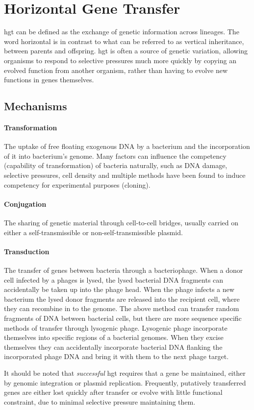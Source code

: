 \section*{Horizontal Gene Transfer}
\ac{hgt} can be defined as the exchange of genetic information across lineages\citep{lgt}.
The word horizontal is in contrast to what can be referred to as vertical inheritance, between parents and offspring\citep{ihgt}.
\ac{hgt} is often a source of genetic variation, allowing organisms to respond to selective pressures much more quickly by copying an evolved function from another organism, rather than having to evolve new functions in genes themselves\citep{ihgt,adaevo}.\par
\subsection*{Mechanisms}
\paragraph{Transformation}
The uptake of free floating exogenous DNA by a bacterium and the incorporation of it into bacterium's genome\citep{lgt}.
Many factors can influence the competency (capability of transformation) of bacteria naturally, such as DNA damage, selective pressures, cell density and multiple methods have been found to induce competency for experimental purposes (cloning)\citep{natcomp}.
\paragraph{Conjugation}
The sharing of genetic material through cell-to-cell bridges, usually carried on either a self-transmissible or non-self-transmissible plasmid\citep{conjug}.
\paragraph{Transduction}
The transfer of genes between bacteria through a bacteriophage\citep{transd}.
When a donor cell infected by a phages is lysed, the lysed bacterial DNA fragments can accidentally be taken up into the phage head\citep{transd}.
When the phage infects a new bacterium the lysed donor fragments are released into the recipient cell, where they can recombine in to the genome\citep{transd}.
The above method can transfer random fragments of DNA between bacterial cells, but there are more sequence specific methods of transfer through lysogenic phage\citep{transd}.
Lysogenic phage incorporate themselves into specific regions of a bacterial genomes\citep{transd}.
When they excise themselves they can accidentally incorporate bacterial DNA flanking the incorporated phage DNA and bring it with them to the next phage target\citep{transd}.\par
It should be noted that \textit{successful} \ac{hgt} requires that a gene be maintained, either by genomic integration or plasmid replication.
Frequently, putatively transferred genes are either lost quickly after transfer or evolve with little functional constraint, due to minimal selective pressure maintaining them\citep{fastlane}.
